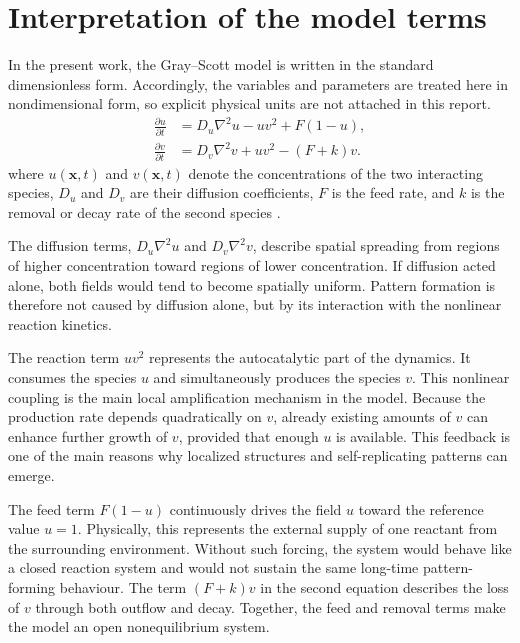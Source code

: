 \section{Interpretation of the model terms}

In the present work, the Gray--Scott model is written in the standard dimensionless form. Accordingly, the variables and parameters are treated here in nondimensional form, so explicit physical units are not attached in this report.
\begin{align}
\frac{\partial u}{\partial t} &= D_u \nabla^2 u - u v^2 + F(1-u), \label{eq:gs_u} \\
\frac{\partial v}{\partial t} &= D_v \nabla^2 v + u v^2 - (F+k)v . \label{eq:gs_v}
\end{align}
where $u(\mathbf{x},t)$ and $v(\mathbf{x},t)$ denote the concentrations of the two interacting species, $D_u$ and $D_v$ are their diffusion coefficients, $F$ is the feed rate, and $k$ is the removal or decay rate of the second species \citep{gandy2022,pearson1993}.

The diffusion terms, $D_u \nabla^2 u$ and $D_v \nabla^2 v$, describe spatial spreading from regions of higher concentration toward regions of lower concentration. If diffusion acted alone, both fields would tend to become spatially uniform. Pattern formation is therefore not caused by diffusion alone, but by its interaction with the nonlinear reaction kinetics.

The reaction term $u v^2$ represents the autocatalytic part of the dynamics. It consumes the species $u$ and simultaneously produces the species $v$. This nonlinear coupling is the main local amplification mechanism in the model. Because the production rate depends quadratically on $v$, already existing amounts of $v$ can enhance further growth of $v$, provided that enough $u$ is available. This feedback is one of the main reasons why localized structures and self-replicating patterns can emerge.

The feed term $F(1-u)$ continuously drives the field $u$ toward the reference value $u=1$. Physically, this represents the external supply of one reactant from the surrounding environment. Without such forcing, the system would behave like a closed reaction system and would not sustain the same long-time pattern-forming behaviour. The term $(F+k)v$ in the second equation describes the loss of $v$ through both outflow and decay. Together, the feed and removal terms make the model an open nonequilibrium system.

